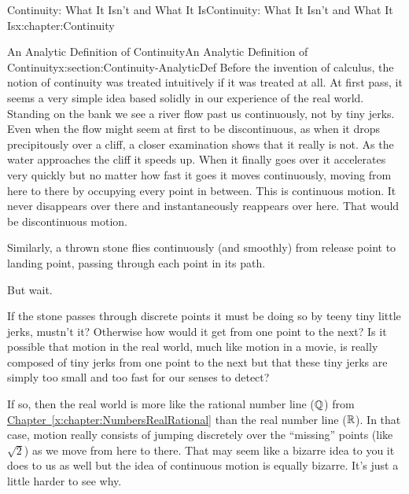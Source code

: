 \typeout{************************************************}
\typeout{************************************************}
%
\begin{chapterptx}{Continuity: What It Isn't and What It Is}{}{Continuity: What It Isn't and What It Is}{}{}{x:chapter:Continuity}
	\typeout{************************************************}
	\typeout{************************************************}
	\begin{sectionptx}{An Analytic Definition of Continuity}{}{An Analytic Definition of Continuity}{}{}{x:section:Continuity-AnalyticDef}
		Before the invention of calculus, the notion of continuity was treated intuitively if it was treated at all.  At first pass, it seems a very simple idea based solidly in our experience of the real world.  Standing on the bank we see a river flow past us continuously, not by tiny jerks.  Even when the flow might seem at first to be discontinuous, as when it drops precipitously over a cliff, a closer examination shows that it really is not. As the water approaches the cliff it speeds up.  When it finally goes over it accelerates very quickly but no matter how fast it goes it moves continuously, moving from here to there by occupying every point in between.  This is continuous motion. It never disappears over there and instantaneously reappears over here.  That would be discontinuous motion.%
		\par
		Similarly, a thrown stone flies continuously (and smoothly) from release point to landing point, passing through each point in its path.%
		\par
		But wait.%
		\par
		If the stone passes through discrete points it must be doing so by teeny tiny little jerks, mustn't it?  Otherwise how would it get from one point to the next?  Is it possible that motion in the real world, much like motion in a movie, is really composed of tiny jerks from one point to the next but that these tiny jerks are simply too small and too fast for our senses to detect?%
		\par
		If so, then the real world is more like the rational number line (\(\mathbb {Q}\)) from \hyperref[x:chapter:NumbersRealRational]{Chapter~{\xreffont\ref{x:chapter:NumbersRealRational}}} than the real number line (\(\mathbb {R}\)).  In that case, motion really consists of jumping discretely over the ``missing'' points (like \(\sqrt{2}\)) as we move from here to there. That may seem like a bizarre idea to you \textemdash{} it does to us as well \textemdash{} but the idea of continuous motion is equally bizarre.  It's just a little harder to see why.%

\end{sectionptx}
\end{chapterptx}
